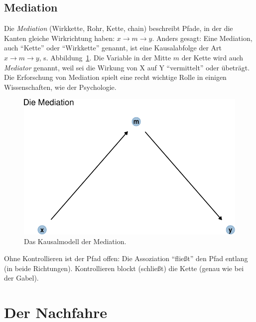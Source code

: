 \documentclass[
  a4paper,
  DIV=11]{scrreprt}
\theoremstyle{definition}
\theoremstyle{remark}
\begin{document}
\hypertarget{mediation}{%
\subsection{Mediation}\label{mediation}}

Die \emph{Mediation} (Wirkkette, Rohr, Kette, chain) beschreibt Pfade,
in der die Kanten gleiche Wirkrichtung haben:
\(x \rightarrow m \rightarrow y\). Anders gesagt: Eine Mediation, auch
``Kette'' oder ``Wirkkette'' genannt, ist eine Kausalabfolge der Art
\(x \rightarrow m \rightarrow y\), s. Abbildung~\ref{fig-med1}. Die
Variable in der Mitte \(m\) der Kette wird auch \emph{Mediator} genannt,
weil sei die Wirkung von X auf Y ``vermittelt'' oder übeträgt. Die
Erforschung von Mediation spielt eine recht wichtige Rolle in einigen
Wissenschaften, wie der Psychologie.

\begin{figure}

{\centering \includegraphics{./kausal_files/figure-pdf/fig-med1-1.pdf}

}

\caption{\label{fig-med1}Das Kausalmodell der Mediation.}

\end{figure}

Ohne Kontrollieren ist der Pfad offen: Die Assoziation ``fließt'' den
Pfad entlang (in beide Richtungen). Kontrollieren blockt (schließt) die
Kette (genau wie bei der Gabel).

\hypertarget{der-nachfahre}{%
\section{Der Nachfahre}\label{der-nachfahre}}
\end{document}
